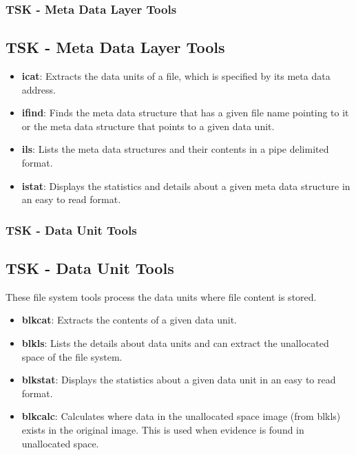 \documentclass{beamer}
\begin{document}
\begin{frame}
	\frametitle{TSK - Meta Data Layer Tools}
	\subsection*{TSK - Meta Data Layer Tools}
	\begin{itemize}
		\item \textbf{icat}: Extracts the data units of a file, which is specified by its meta data address.
		\item \textbf{ifind}: Finds the meta data structure that has a given file name pointing to it or the meta data structure that points to a given data unit.
		\item \textbf{ils}: Lists the meta data structures and their contents in a pipe delimited format.
		\item \textbf{istat}: Displays the statistics and details about a given meta data structure in an easy to read format.
	\end{itemize}
\end{frame}

\begin{frame}
	\frametitle{TSK - Data Unit Tools}
	\subsection*{TSK - Data Unit Tools}
	These file system tools process the data units where file content is stored.
	\begin{itemize}
		\item \textbf{blkcat}: Extracts the contents of a given data unit.
		\item \textbf{blkls}: Lists the details about data units and can extract the unallocated space of the file system.
		\item \textbf{blkstat}: Displays the statistics about a given data unit in an easy to read format.
		\item \textbf{blkcalc}: Calculates where data in the unallocated space image (from blkls) exists in the original image. This is used when evidence is found in unallocated space.
	\end{itemize}
\end{frame}
\end{document}
